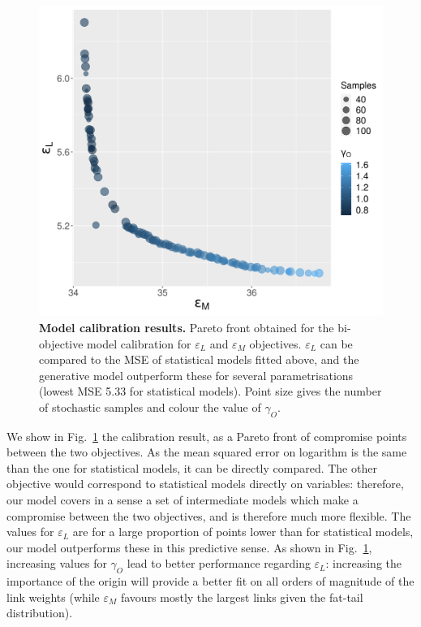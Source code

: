 \documentclass[10pt,letterpaper]{article}
\begin{document}
\begin{figure}
	\begin{center}
    \includegraphics[width=0.75\linewidth]{figures/Fig8.png}
    \end{center}
	\caption{\textbf{Model calibration results.} Pareto front obtained for the bi-objective model calibration for $\varepsilon_L$ and $\varepsilon_M$ objectives. $\varepsilon_L$ can be compared to the MSE of statistical models fitted above, and the generative model outperform these for several parametrisations (lowest MSE 5.33 for statistical models). Point size gives the number of stochastic samples and colour the value of $\gamma_O$.\label{fig:fig8}}
\end{figure}


We show in Fig.~\ref{fig:fig8} the calibration result, as a Pareto front of compromise points between the two objectives. As the mean squared error on logarithm is the same than the one for statistical models, it can be directly compared. The other objective would correspond to statistical models directly on variables: therefore, our model covers in a sense a set of intermediate models which make a compromise between the two objectives, and is therefore much more flexible. The values for $\varepsilon_L$ are for a large proportion of points lower than for statistical models, our model outperforms these in this predictive sense. As shown in Fig.~\ref{fig:fig8}, increasing values for $\gamma_O$ lead to better performance regarding $\varepsilon_L$: increasing the importance of the origin will provide a better fit on all orders of magnitude of the link weights (while $\varepsilon_M$ favours mostly the largest links given the fat-tail distribution).
\end{document}
